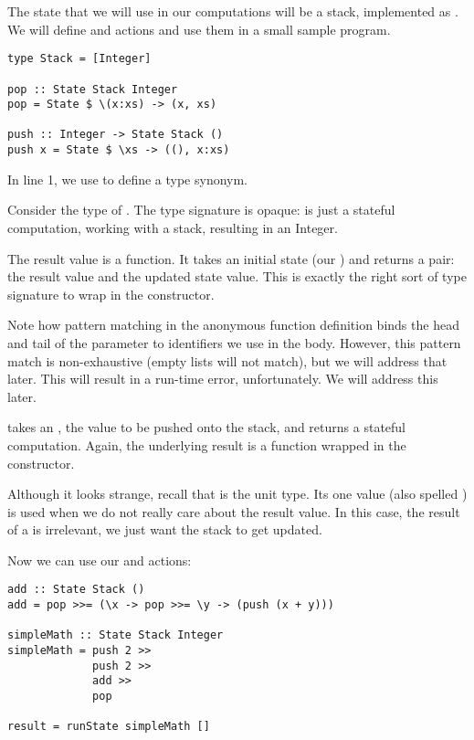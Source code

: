 The state that we will use in our computations will be a stack, implemented as \code{[Integer]}. We will define
 and  actions and use them in a small sample program.

\begin{lstlisting}
type Stack = [Integer]

pop :: State Stack Integer
pop = State $ \(x:xs) -> (x, xs)

push :: Integer -> State Stack ()
push x = State $ \xs -> ((), x:xs)
\end{lstlisting}

\begin{notelist}
    \item In line 1, we use  to define a type synonym.
    \item Consider the type of . The type signature is opaque:  is just a stateful computation, working
          with a stack, resulting in an Integer.
    \item The result value is a function. It takes an initial state (our ) and returns a pair: the
          result value and the updated state value. This is exactly the right sort of type signature to wrap
          in the  constructor.
    \item Note how pattern matching in the anonymous function definition binds the head and tail of the  parameter
          to identifiers we use in the body. However, this pattern match is non-exhaustive (empty lists will not match),
          but we will address that later. This will result in a run-time error, unfortunately. We will address this later.
    \item {} takes an , the value to be pushed onto the stack, and returns a stateful computation.
          Again, the underlying result is a function wrapped in the  constructor.
    \item Although it looks strange, recall that \code{()} is the unit type. Its one value (also spelled \code{()}) is used when
          we do not really care about the result value. In this case, the result of a  is irrelevant, we just want
          the stack to get updated.
\end{notelist}

Now we can use our  and  actions:

\begin{lstlisting}
add :: State Stack ()
add = pop >>= (\x -> pop >>= \y -> (push (x + y)))

simpleMath :: State Stack Integer
simpleMath = push 2 >>
             push 2 >>
             add >>
             pop

result = runState simpleMath []
\end{lstlisting}

